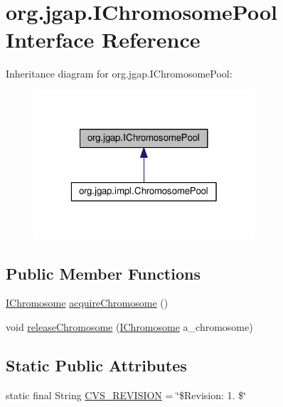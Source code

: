 \hypertarget{interfaceorg_1_1jgap_1_1_i_chromosome_pool}{\section{org.\-jgap.\-I\-Chromosome\-Pool Interface Reference}
\label{interfaceorg_1_1jgap_1_1_i_chromosome_pool}
}


Inheritance diagram for org.\-jgap.\-I\-Chromosome\-Pool\-:
\nopagebreak
\begin{figure}[H]
\begin{center}
\leavevmode
\includegraphics[width=232pt]{interfaceorg_1_1jgap_1_1_i_chromosome_pool__inherit__graph}
\end{center}
\end{figure}
\subsection*{Public Member Functions}
\begin{DoxyCompactItemize}
\item 
\hyperlink{interfaceorg_1_1jgap_1_1_i_chromosome}{I\-Chromosome} \hyperlink{interfaceorg_1_1jgap_1_1_i_chromosome_pool_a8ca58eebe408999a357f4c6c8d413f9d}{acquire\-Chromosome} ()
\item 
void \hyperlink{interfaceorg_1_1jgap_1_1_i_chromosome_pool_a79be125cb49cca7236932cc2dbc7f014}{release\-Chromosome} (\hyperlink{interfaceorg_1_1jgap_1_1_i_chromosome}{I\-Chromosome} a\-\_\-chromosome)
\end{DoxyCompactItemize}
\subsection*{Static Public Attributes}
\begin{DoxyCompactItemize}
\item 
static final String \hyperlink{interfaceorg_1_1jgap_1_1_i_chromosome_pool_ab847d47751d5e687022ffb82b3ce7937}{C\-V\-S\-\_\-\-R\-E\-V\-I\-S\-I\-O\-N} = \char`\"{}\$Revision\-: 1. \$\char`\"{}
\end{DoxyCompactItemize}


